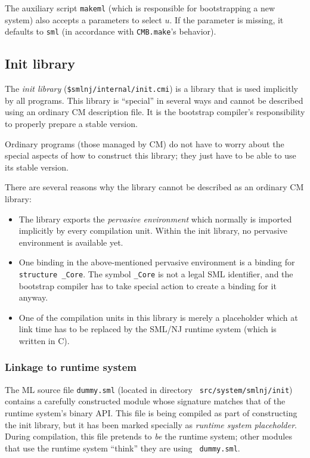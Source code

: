 The auxiliary script {\tt makeml} (which is responsible for
bootstrapping a new system) also accepts a parameters to select $u$.
If the parameter is missing, it defaults to {\tt sml} (in accordance
with {\tt CMB.make}'s behavior).

\subsection{Init library}

The {\em init library} ({\tt \$smlnj/internal/init.cmi}) is a library
that is used implicitly by all programs.  This library is ``special''
in several ways and cannot be described using an ordinary CM
description file.  It is the bootstrap compiler's responsibility to
properly prepare a stable version.

Ordinary programs (those managed by CM) do not have to worry about the
special aspects of how to construct this library; they just have to be
able to use its stable version.

There are several reasons why the library cannot be described as an
ordinary CM library:

\begin{itemize}
\item The library exports the {\em pervasive environment} which
normally is imported implicitly by every compilation unit.  Within the
init library, no pervasive environment is available yet.
\item One binding in the above-mentioned pervasive environment is a
binding for {\tt structure \_Core}.  The symbol {\tt \_Core} is not a
legal SML identifier, and the bootstrap compiler has to take special
action to create a binding for it anyway.
\item One of the compilation units in this library is merely a
placeholder which at link time has to be replaced by the SML/NJ
runtime system (which is written in C).
\end{itemize}

\subsubsection{Linkage to runtime system}

The ML source file {\tt dummy.sml} (located in directory {\tt
src/system/smlnj/init}) contains a carefully constructed module whose
signature matches that of the runtime system's binary API.  This file
is being compiled as part of constructing the init library, but it has
been marked specially as {\em runtime system placeholder}.  During
compilation, this file pretends to {\em be} the runtime system; other
modules that use the runtime system ``think'' they are using {\tt
dummy.sml}.

